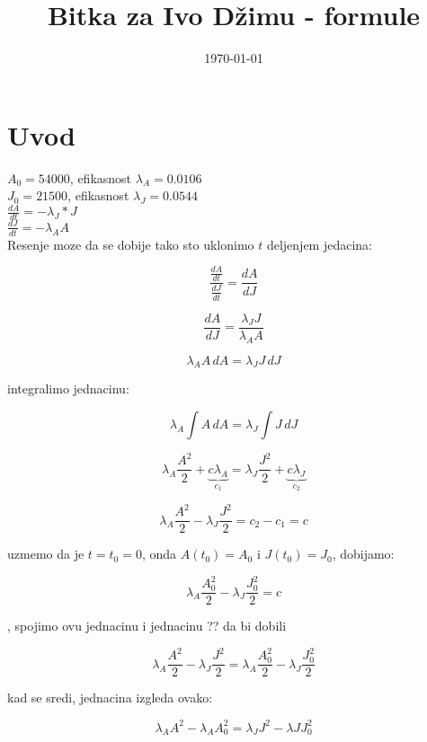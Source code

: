 \documentclass{article}
\title{Bitka za Ivo Džimu - formule}
\author{}
\date{\today}
\begin{document}
\maketitle


\section*{Uvod}

\(A_0 = 54000\), efikasnost \(\lambda_A = 0.0106\) \\
\(J_0 = 21500\), efikasnost \(\lambda_J = 0.0544\) \\

\(\frac{dA}{dt} = - \lambda_{J}*J\) \\
\(\frac{dJ}{dt} = - \lambda_{A}A\) \\

Resenje moze da se dobije tako sto uklonimo $t$ deljenjem jedacina:

\[
  \frac{\displaystyle \frac{\displaystyle dA}{\displaystyle dt}}{\displaystyle  \frac{\displaystyle dJ}{\displaystyle dt} } = \frac{\displaystyle dA}{\displaystyle dJ}
\]

\[
  \frac{\displaystyle dA}{\displaystyle dJ} = \frac{\displaystyle \lambda_{J}J}{\displaystyle \lambda_{A}A}
\]

\[
  \lambda_{A}A\,dA = \lambda_{J}J\,dJ
\]

integralimo jednacinu:

\[
  \lambda_{A}\int{} A\,dA = \lambda_{J} \int{} J\,dJ
\]

\[
  \lambda_{A} \frac{\displaystyle A^2}{\displaystyle 2} + \underbrace{c\lambda_{A}}_{c_1}
  = \lambda_{J} \frac{J^2}{2} + \underbrace{c\lambda_{J}}_{c_2}
\]

\[
  \lambda_{A} \frac{A^2}{2} - \lambda_{J} \frac{J^2}{2} = c_2 - c_1 = c
\]

uzmemo da je \(t = t_0 = 0\), onda \(A(t_0) = A_0\) i \(J(t_0) = J_0\),
dobijamo:

\[
  \lambda_{A}\frac{A_{0}^2}{2} - \lambda_{J}\frac{J_{0}^2}{2} = c
\]

, spojimo ovu jednacinu i jednacinu ?? da bi dobili

\[
  \lambda_{A}\frac{A^2}{2} - \lambda_{J}\frac{J^2}{2} =
\lambda_{A}\frac{A_{0}^2}{2} - \lambda_{J}\frac{J_{0}^2}{2}
\]

kad se sredi, jednacina izgleda ovako:

\[
  \lambda_{A}A^2 - \lambda_{A}A_{0}^2 = \lambda_{J}J^2 - \lambda{J}J_{0}^2
\]
\end{document}
